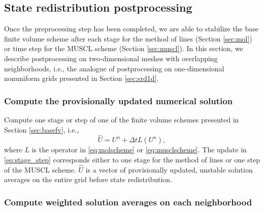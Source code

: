 \subsection{State redistribution postprocessing} \label{sec:srd_postprocessing}

Once the preprocessing step has been completed, we are able to stabilize the base finite volume scheme after each stage for the method of lines (Section \ref{sec:mol}) or time step for the MUSCL scheme (Section \ref{sec:muscl}). 
In this section, we describe postprocessing on two-dimensional meshes with overlapping neighborhoods, i.e., the analogue of postprocessing on one-dimensional nonuniform grids presented in Section \ref{sec:srd1d}.


\subsubsection*{Compute the provisionally updated numerical solution}   
Compute one stage or step of one of the finite volume schemes presented in Section \ref{sec:basefv}, i.e.,
\begin{equation} \label{eq:stage_step}
\widehat{U} = U^n + \Delta t  L(U^n),
\end{equation}
where $L$ is the operator in \eqref{eq:molscheme} or \eqref{eq:musclscheme}.  
The update in \eqref{eq:stage_step} corresponds either to one stage for the method of lines or one step of the MUSCL scheme.
$\widehat{U}$ is a vector of provisionally updated, unstable solution averages on the entire grid before state redistribution.


\subsubsection*{Compute weighted solution averages on each neighborhood}   


